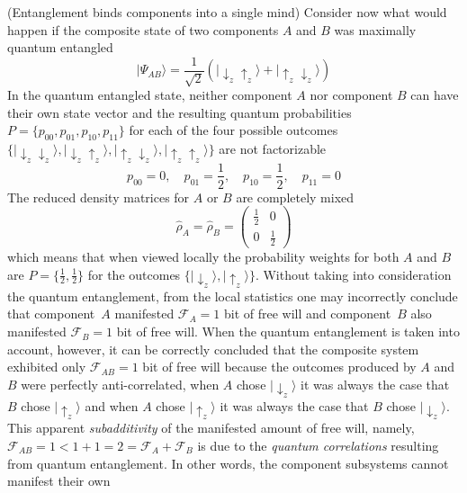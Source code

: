 \documentclass{ws-ijmpb}
\begin{document}
\begin{example}
(Entanglement binds components into a single mind) Consider now what
would happen if the composite state of two components $A$ and $B$
was maximally quantum entangled
\begin{equation}
|\Psi_{AB}\rangle=\frac{1}{\sqrt{2}}\left(|\downarrow_{z}\uparrow_{z}\rangle+|\uparrow_{z}\downarrow_{z}\rangle\right)
\end{equation}
In the quantum entangled state, neither component $A$ nor component $B$
can have their own state vector and the resulting quantum probabilities
$P=\{p_{00},p_{01},p_{10},p_{11}\}$ for each of the four possible
outcomes $\{|\downarrow_{z}\downarrow_{z}\rangle,|\downarrow_{z}\uparrow_{z}\rangle,|\uparrow_{z}\downarrow_{z}\rangle,|\uparrow_{z}\uparrow_{z}\rangle\}$
are not factorizable
\begin{equation}
p_{00}=0,\quad p_{01}=\frac{1}{2},\quad p_{10}=\frac{1}{2},\quad p_{11}=0
\end{equation}
The reduced density matrices for $A$ or $B$ are completely mixed
\begin{equation}
\hat{\rho}_{A}=\hat{\rho}_{B}=\left(\begin{array}{cc}
\frac{1}{2} & 0\\
0 & \frac{1}{2}
\end{array}\right)
\end{equation}
which means that when viewed locally the probability weights for both
$A$ and $B$ are $P=\{\frac{1}{2},\frac{1}{2}\}$ for the outcomes
$\{|\downarrow_{z}\rangle,|\uparrow_{z}\rangle\}$.
Without taking into consideration the quantum entanglement, from the local
statistics one may incorrectly conclude that component~$A$ manifested $\mathscr{F}_{A}=1$
bit of free will and component~$B$ also manifested $\mathscr{F}_{B}=1$
bit of free will. When the quantum entanglement is taken into account,
however, it can be correctly concluded that the composite system exhibited only
$\mathscr{F}_{AB}=1$ bit of free will because the outcomes produced
by $A$ and $B$ were perfectly anti-correlated, when $A$ chose $|\downarrow_{z}\rangle$
it was always the case that $B$ chose $|\uparrow_{z}\rangle$ and
when $A$ chose $|\uparrow_{z}\rangle$ it was always the case that
$B$ chose $|\downarrow_{z}\rangle$. This apparent \emph{subadditivity}
of the manifested amount of free will, namely, $\mathscr{F}_{AB}=1<1+1=2=\mathscr{F}_{A}+\mathscr{F}_{B}$
is due to the \emph{quantum correlations} resulting from quantum entanglement.
In other words, the component subsystems cannot manifest their own

\end{example}
\end{document}
